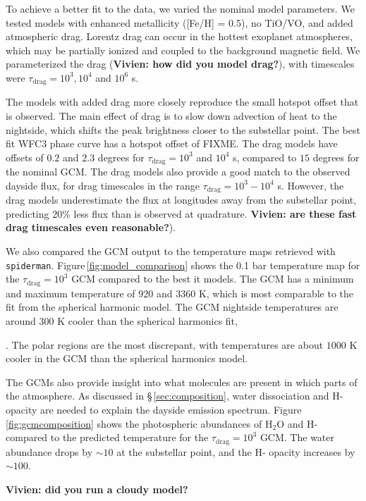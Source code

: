 \documentclass[twocolumn]{aastex61}
\begin{document}
To achieve a better fit to the data, we varied the nominal model parameters. We tested models with enhanced metallicity ([Fe/H] = 0.5), no TiO/VO, and added atmospheric drag.  Lorentz drag can occur in the hottest exoplanet atmospheres, which may be partially ionized and coupled to the background magnetic field. We parameterized the drag (\textbf{Vivien: how did you model drag?}), with timescales were $\tau_\mathrm{drag} = 10^3, 10^4$ and $10^6$ s. 

The models with added drag more closely reproduce the small hotspot offset that is observed. The main effect of drag is to slow down advection of heat to the nightside, which shifts the peak brightness closer to the substellar point.  The best fit WFC3 phase curve has a hotspot offset of FIXME. The drag models have offsets of $0.2$ and $2.3$ degrees for $\tau_\mathrm{drag} = 10^3$ and $10^4$ s, compared to $15$ degrees for the nominal GCM.  The drag models also provide a good match to the observed dayside flux, for drag timescales in the range $\tau_\mathrm{drag} = 10^3 - 10^4$ s.  However, the drag models underestimate the flux at longitudes away from the substellar point, predicting 20\% less flux than is observed at quadrature. \textbf{Vivien: are these fast drag timescales even reasonable?}).

We also compared the GCM output to the temperature maps retrieved with \texttt{spiderman}. Figure\,\ref{fig:model_comparison} shows the 0.1 bar temperature map for the $\tau_\mathrm{drag} = 10^3$ GCM compared to the best it models. The GCM has a minimum and maximum temperature of $920$ and $3360$ K, which is most comparable to the fit from the spherical harmonic model.  The GCM nightside temperatures are around $300$ K cooler than the spherical harmonics fit, 

. The polar regions are the most discrepant, with temperatures are about $1000$ K cooler in the GCM than the spherical harmonics model.

The GCMs also provide insight into what molecules are present in which parts of the atmosphere. As discussed in \S\,\ref{sec:composition}, water dissociation and H- opacity are needed to explain the dayside emission spectrum. Figure\,\ref{fig:gcmcomposition} shows the photospheric abundances of H$_2$O and H- compared to the predicted temperature for the $\tau_\mathrm{drag} = 10^3$ GCM. The water abundance drops by $\sim10$ at the substellar point, and the H- opacity increases by $\sim100$. 

\textbf{Vivien: did you run a cloudy model?}
\end{document}
